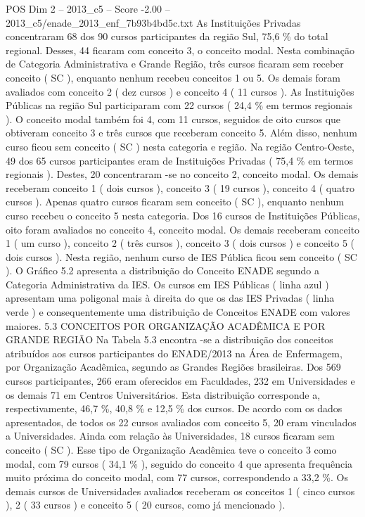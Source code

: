 \begin{textsample}{POS Dim 2 – 2013\_c5 – Score -2.00 – 2013\_c5/enade\_2013\_enf\_7b93b4bd5c.txt}
As Instituições Privadas concentraram 68 dos 90 cursos participantes da região Sul, 75,6 \% do total regional.
Desses, 44 ficaram com conceito 3, o conceito modal.
Nesta combinação de Categoria Administrativa e Grande Região, três cursos ficaram sem receber conceito ( SC ), enquanto nenhum recebeu conceitos 1 ou 5.
Os demais foram avaliados com conceito 2 ( dez cursos ) e conceito 4 ( 11 cursos ).
As Instituições Públicas na região Sul participaram com 22 cursos ( 24,4 \% em termos regionais ).
O conceito modal também foi 4, com 11 cursos, seguidos de oito cursos que obtiveram conceito 3 e três cursos que receberam conceito 5.
Além disso, nenhum curso ficou sem conceito ( SC ) nesta categoria e região.
Na região Centro-Oeste, 49 dos 65 cursos participantes eram de Instituições Privadas ( 75,4 \% em termos regionais ).
Destes, 20 concentraram -se no conceito 2, conceito modal.
Os demais receberam conceito 1 ( dois cursos ), conceito 3 ( 19 cursos ), conceito 4 ( quatro cursos ).
Apenas quatro cursos ficaram sem conceito ( SC ), enquanto nenhum curso recebeu o conceito 5 nesta categoria.
Dos 16 cursos de Instituições Públicas, oito foram avaliados no conceito 4, conceito modal.
Os demais receberam conceito 1 ( um curso ), conceito 2 ( três cursos ), conceito 3 ( dois cursos ) e conceito 5 ( dois cursos ).
Nesta região, nenhum curso de IES Pública ficou sem conceito ( SC ).
O Gráfico 5.2 apresenta a distribuição do Conceito ENADE segundo a Categoria Administrativa da IES.
Os cursos em IES Públicas ( linha azul ) apresentam uma poligonal mais à direita do que os das IES Privadas ( linha verde ) e consequentemente uma distribuição de Conceitos ENADE com valores maiores. 5.3 CONCEITOS POR ORGANIZAÇÃO ACADÊMICA E POR GRANDE REGIÃO Na Tabela 5.3 encontra -se a distribuição dos conceitos atribuídos aos cursos participantes do ENADE/2013 na Área de Enfermagem, por Organização Acadêmica, segundo as Grandes Regiões brasileiras.
Dos 569 cursos participantes, 266 eram oferecidos em Faculdades, 232 em Universidades e os demais 71 em Centros Universitários.
Esta distribuição corresponde a, respectivamente, 46,7 \%, 40,8 \% e 12,5 \% dos cursos.
De acordo com os dados apresentados, de todos os 22 cursos avaliados com conceito 5, 20 eram vinculados a Universidades.
Ainda com relação às Universidades, 18 cursos ficaram sem conceito ( SC ).
Esse tipo de Organização Acadêmica teve o conceito 3 como modal, com 79 cursos ( 34,1 \% ), seguido do conceito 4 que apresenta frequência muito próxima do conceito modal, com 77 cursos, correspondendo a 33,2 \%.
Os demais cursos de Universidades avaliados receberam os conceitos 1 ( cinco cursos ), 2 ( 33 cursos ) e conceito 5 ( 20 cursos, como já mencionado ).

\end{textsample}
